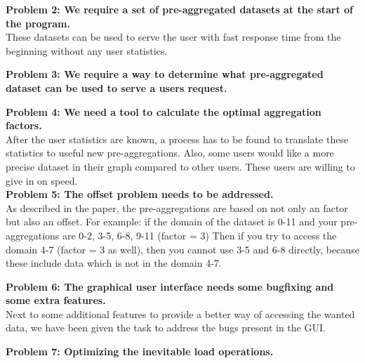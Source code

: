 \textbf{Problem 2: We require a set of pre-aggregated datasets at the start of the program.}\\
These datasets can be used to serve the user with fast response time from the beginning without any user statistics.

\textbf{Problem 3: We require a way to determine what pre-aggregated dataset can be used to serve a users request.}


\textbf{Problem 4: We need a tool to calculate the optimal aggregation factors.}\\
After the user statistics are known, a process has to be found to translate these statistics to useful new pre-aggregations. Also, some users would like a more precise dataset in their graph compared to other users. These users are willing to give in on speed.\\

\textbf{Problem 5: The offset problem needs to be addressed.}\\
As described in the paper\cite{wombacher2011}, the pre-aggregations are based on not only an factor but also an offset. For example: if the domain of the dataset is 0-11 and your pre-aggregations are 0-2, 3-5, 6-8, 9-11 (factor = 3) Then if you try to access the domain 4-7 (factor = 3 as well), then you cannot use 3-5 and 6-8 directly, because these include data which is not in the domain 4-7. 

\textbf{Problem 6: The graphical user interface needs some bugfixing and some extra features.}\\
Next to some additional features to provide a better way of accessing the wanted data, we have been given the task to address the bugs present in the GUI.

\textbf{Problem 7: Optimizing the inevitable load operations.}
